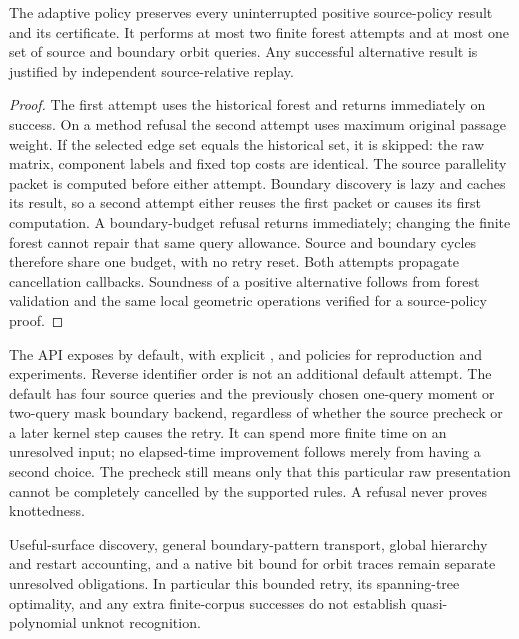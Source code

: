 \begin{proposition}
The adaptive policy preserves every uninterrupted positive source-policy
result and its certificate. It performs at most two finite forest attempts
and at most one set of source and boundary orbit queries. Any successful
alternative result is justified by independent source-relative replay.
\end{proposition}
\begin{proof}
The first attempt uses the historical forest and returns immediately on
success. On a method refusal the second attempt uses maximum original
passage weight. If the selected edge set equals the historical set, it is
skipped: the raw matrix, component labels and fixed top costs are identical.
The source parallelity packet is computed before either attempt. Boundary
discovery is lazy and caches its result, so a second attempt either reuses
the first packet or causes its first computation. A boundary-budget refusal
returns immediately; changing the finite forest cannot repair that same
query allowance. Source and boundary cycles therefore share one budget,
with no retry reset. Both attempts propagate cancellation callbacks.
Soundness of a positive alternative follows from forest validation and the
same local geometric operations verified for a source-policy proof.
\end{proof}

The API exposes  by default, with explicit
,  and  policies for
reproduction and experiments. Reverse identifier order is not an additional
default attempt. The default has four source queries and the previously
chosen one-query moment or two-query mask boundary backend, regardless of
whether the source precheck or a later kernel step causes the retry.
It can spend more finite time on an unresolved input; no elapsed-time
improvement follows merely from having a second choice. The precheck still
means only that this particular raw presentation cannot be completely
cancelled by the supported rules. A refusal never proves knottedness.

Useful-surface discovery, general boundary-pattern transport, global
hierarchy and restart accounting, and a native bit bound for orbit traces
remain separate unresolved obligations. In particular this bounded retry,
its spanning-tree optimality, and any extra finite-corpus successes do not
establish quasi-polynomial unknot recognition.


